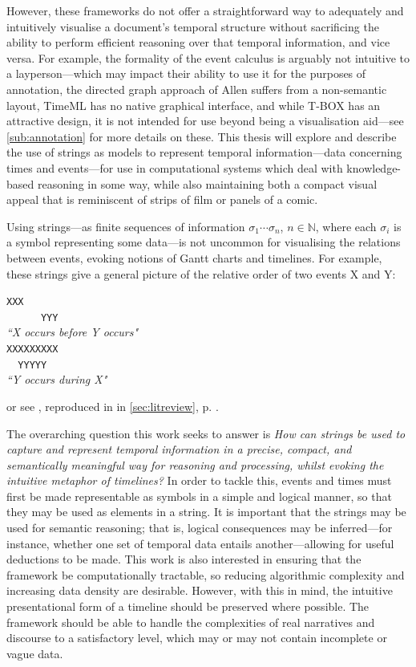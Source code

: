 \documentclass[a4paper,12pt,leqno,twoside]{article}
\begin{document}
However, these frameworks do not offer a straightforward way to adequately and intuitively visualise a document's temporal structure without sacrificing the ability to perform efficient reasoning over that temporal information, and vice versa. For example, the formality of the event calculus is arguably not intuitive to a layperson---which may impact their ability to use it for the purposes of annotation, the directed graph approach of Allen suffers from a non-semantic layout, TimeML has no native graphical interface, and while T-BOX has an attractive design, it is not intended for use beyond being a visualisation aid---see \cref{sub:annotation} for more details on these. This thesis will explore and describe the use of strings as models to represent temporal information---data concerning times and events---for use in computational systems which deal with knowledge-based reasoning in some way, while also maintaining both a compact visual appeal that is reminiscent of strips of film or panels of a comic.

Using strings---as finite sequences of information $\sigma_1 \cdots \sigma_n$, $n \in \mathbb{N}$, where each $\sigma_i$ is a symbol representing some data---is not uncommon for visualising the relations between events, evoking notions of Gantt charts and timelines. For example, these strings give a general picture of the relative order of two events X and Y:

{
\singlespacing
\begin{center}
\verb|XXX      |\\
\verb|      YYY|\\
\textit{``X occurs before Y occurs"}\\
\vspace{1em}
\verb|XXXXXXXXX|\\
\verb|  YYYYY  |\\
\textit{``Y occurs during X"}\\
\end{center}
}
\noindent
or see \citet[p. 835, Figure 2]{allen1983maintaining}, reproduced in  in \cref{sec:litreview}, p. \pageref{fig:allens-pictorial}.

The overarching question this work seeks to answer is {\sl How can strings be used to capture and represent temporal information in a precise, compact, and semantically meaningful way for reasoning and processing, whilst evoking the intuitive metaphor of timelines?} In order to tackle this, events and times must first be made representable as symbols in a simple and logical manner, so that they may be used as elements in a string. It is important that the strings may be used for semantic reasoning; that is, logical consequences may be inferred---for instance, whether one set of temporal data entails another---allowing for useful deductions to be made. This work is also interested in ensuring that the framework be computationally tractable, so reducing algorithmic complexity and increasing data density are desirable. However, with this in mind, the intuitive presentational form of a timeline should be preserved where possible. The framework should be able to handle the complexities of real narratives and discourse to a satisfactory level, which may or may not contain incomplete or vague data.
\end{document}
